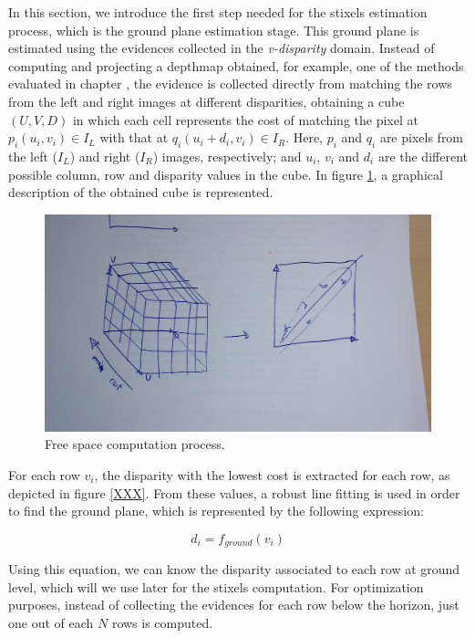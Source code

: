 In this section, we introduce the first step needed for the stixels estimation process, which is the ground plane estimation stage. This ground plane is estimated using the evidences collected in the \emph{v-disparity} domain. Instead of computing and projecting a depthmap obtained, for example, one of the methods evaluated in chapter , the evidence is collected directly from matching the rows from the left and right images at different disparities, obtaining a cube $(U, V, D)$ in which each cell represents the cost of matching the pixel at $p_i(u_i, v_i) \in I_L$ with that at $q_i(u_i + d_i, v_i) \in I_R$. Here, $p_i$ and $q_i$ are pixels from the left ($I_L$) and right ($I_R$) images, respectively; and $u_i$, $v_i$ and $d_i$ are the different possible column, row and disparity values in the cube. In figure \ref{fig:cp04_freespace}, a graphical description of the obtained cube is represented.

\begin{figure}[h!]
  \centering
  \includegraphics[width=\textwidth]{freespace}
  \caption{Free space computation process.}\label{fig:cp04_freespace}
\end{figure}

For each row $v_i$, the disparity with the lowest cost is extracted for each row, as depicted in figure \ref{XXX}. From these values, a robust line fitting is used in order to find the ground plane, which is represented by the following expression:

\begin{equation}\label{eq:cp04_ground_plane_function}
  d_i = f_{ground}(v_i)
\end{equation}

Using this equation, we can know the disparity associated to each row at ground level, which will we use later for the stixels computation. For optimization purposes, instead of collecting the evidences for each row below the horizon, just one out of each $N$ rows is computed. 

